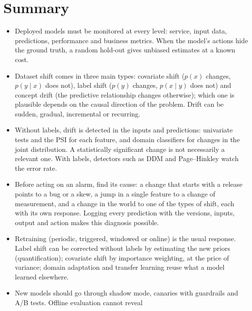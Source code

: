 \section{Summary}\label{sec:summary6}

\begin{itemize}
  \item Deployed models must be monitored at every level: service, input data, predictions, performance and business metrics.
        When the model's actions hide the ground truth, a random hold-out gives unbiased estimates at a known cost.
  \item Dataset shift comes in three main types: covariate shift ($p(x)$ changes, $p(y\mid x)$ does not), label shift ($p(y)$
        changes, $p(x\mid y)$ does not) and concept drift (the predictive relationship changes otherwise); which one is plausible depends on the causal direction of the problem. Drift can be sudden,
        gradual, incremental or recurring.
  \item Without labels, drift is detected in the inputs and predictions: univariate tests and the PSI for each feature, and
        domain classifiers for changes in the joint distribution. A statistically significant change is not necessarily a relevant one. With labels,
        detectors such as DDM and Page--Hinkley watch the error rate.
  \item Before acting on an alarm, find its cause: a change that starts with a release points to a bug or
a skew, a jump in a single feature to a change of measurement, and a change in the world to one of the
types of shift, each with its own response. Logging every prediction with the versions, inputs, output
and action makes this diagnosis possible.
\item Retraining (periodic, triggered, windowed or online) is the usual response. Label shift can be corrected without labels
        by estimating the new priors (quantification); covariate shift by importance weighting, at the price of variance; domain
        adaptation and transfer learning reuse what a model learned elsewhere.
  \item New models should go through shadow mode, canaries with guardrails and A/B tests. Offline evaluation cannot reveal

\end{itemize}
